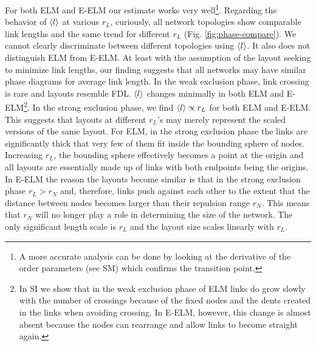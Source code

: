 \documentclass[nofootinbib,preprint,floatfix,endfloats]{revtex4} %
\begin{document}
For both ELM and E-ELM our estimate works very well\footnote{A more accurate analysis can be done by looking at the derivative of the order parameters (see SM) which confirms the transition point.}. 
Regarding the behavior of $\left<l\right>$ at various $r_L$, curiously, all network topologies show comparable link lengths and the same trend for different $r_L$ (Fig. \ref{fig:phase-compare}).
We cannot clearly discriminate between different topologies using $\left<l\right>$. 
It also does not distinguish ELM from E-ELM. 
At least with the assumption of the layout seeking to minimize link lengths, our finding suggests that all networks may have similar phase diagrams for average link length. 
In the weak exclusion phase, link crossing is rare and layouts resemble FDL.
$\left<l\right>$ changes minimally in both ELM and E-ELM\footnote{
In SI we show that in the weak exclusion phase of ELM links do grow slowly with the number of crossings because of the fixed nodes and the dents created in the links when avoiding crossing. 
In E-ELM, however, this change is almost absent because the nodes can rearrange and allow links to become straight again.}. 
In the strong exclusion phase, we find $\left<l\right> \propto r_L$ for both ELM and E-ELM.
This suggests that layouts at different $r_L$'s may merely represent the scaled versions of the same layout.
For ELM, %
in the strong exclusion phase the links are significantly thick that very few of them fit inside the bounding sphere of nodes. 
Increasing $r_L$, the bounding sphere effectively becomes a point at the origin and all layouts are essentially made up of links with both endpoints being the origins. 
In E-ELM the reason the layouts become similar is that in the strong exclusion phase $r_L > r_N$ and, therefore, links push against each other to the extent that the distance between nodes becomes larger than their repulsion range $r_N$. This means that $r_N$ will no longer play a role in determining the size of the network. The only significant length scale is $r_L$ and the layout size scales linearly with $r_L$. 
\end{document}
